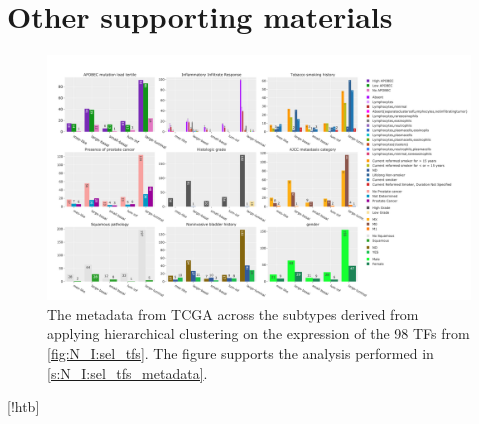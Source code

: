 \section{Other supporting materials}

\begin{figure}
    \centering
    \includegraphics[width=1.0\textwidth,keepaspectratio]{Sections/Network_I/Resources/selective_pruning/sel_tfs/sel_tfs_tcga_meta.png}
      \caption[TCGA metadata and the groups derived from the 98 TFs]{The metadata from TCGA \cite{Robertson2017-mg} across the subtypes derived from applying hierarchical clustering on the expression of the 98 TFs from \cref{fig:N_I:sel_tfs}. The figure supports the analysis performed in \cref{s:N_I:sel_tfs_metadata}.}
    \label{fig:ap:sel_tfs_tcga_metadata}
\end{figure}[!htb]   


\newpage 




